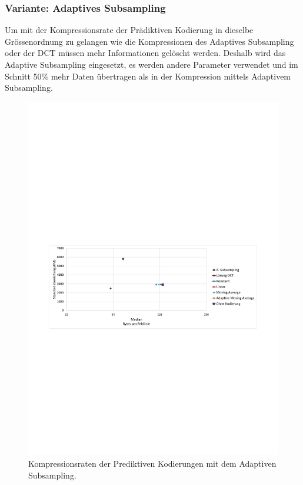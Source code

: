 \subsubsection{Variante: Adaptives Subsampling} \label{resultate:loesung2:adaptive}
Um mit der Kompressionsrate der Prädiktiven Kodierung in dieselbe Grössenordnung zu gelangen wie die Kompressionen des Adaptives Subsampling oder der DCT müssen mehr Informationen gelöscht werden. Deshalb wird das Adaptive Subsampling eingesetzt, es werden andere Parameter verwendet und im Schnitt 50\% mehr Daten übertragen als in der Kompression mittels Adaptivem Subsampling.

\begin{figure}[!htbp]
	\center
	\includegraphics[trim = 1.8cm 11cm 1.8cm 12.5cm, clip=true,
width=1\textwidth,keepaspectratio]{./pictures/resultate/loesung2/variante1/resultate_euler.pdf}
	\caption{Kompressionsraten der Prediktiven Kodierungen mit dem Adaptiven Subsampling.}
	\label{resultate:loesung2:adaptive:euler}
\end{figure}
